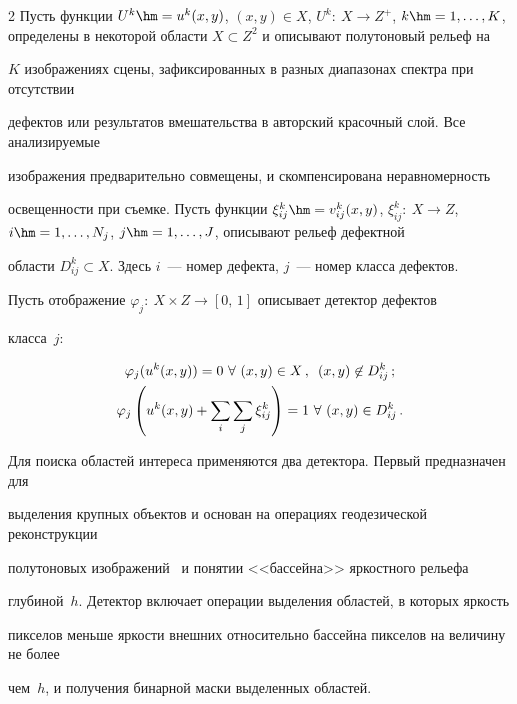 \begin{multicols}{2}
  Пусть функции $U^k\hm=u^k(x,y)$, $(x,y)\in X$, $U^k:\ X\rightarrow Z^+$, $k\hm=1, \ldots 


,K$, определены в некоторой области $X\subset Z^2$ и описывают полутоновый рельеф на 


$K$ изображениях сцены, зафиксированных в разных диапазонах спектра при отсутствии 


дефектов или результатов вмешательства в авторский красочный слой. Все анализируемые 


изображения предварительно совмещены, и скомпенсирована неравномерность 


освещенности при съемке. Пусть функции  $\xi^k_{ij}\hm=v_{ij}^k(x,y)$, $\xi^k_{ij}:\ 


X\rightarrow Z$, $i\hm= 1, \ldots ,N_j$, $j\hm=1, \ldots ,J$, описывают рельеф дефектной 


области $D_{ij}^k\subset X$. Здесь $i$~--- номер дефекта, $j$~--- номер класса дефектов. 


Пусть отображение  $\varphi_j:\ X\times Z \rightarrow [0,\,1]$ описывает детектор дефектов 


класса~$j$:


  \begin{gather*}


  \varphi_j(u^k(x,y))=0\ \forall\ (x,y)\in X\,,\enskip (x,y)\not\in D_{ij}^k\,;\\


  \varphi_j\left(u^k(x,y)+\sum\limits_i \sum\limits_j \xi_{ij}^k\right) =1\ \forall\ (x,y)\in 


D_{ij}^k\,.


  \end{gather*}





  Для поиска областей интереса применяются два детектора. Первый предназначен для 


выделения крупных объектов и основан на операциях геодезической реконструкции 


полутоновых изображений~\cite{16mur} и понятии <<бассейна>> яркостного рельефа 


глубиной~$h$. Детектор включает операции выделения областей, в которых яркость 


пикселов меньше яркости внешних относительно бассейна пикселов на величину не более 


чем~$h$, и получения бинарной маски выделенных областей.






\end{multicols}
